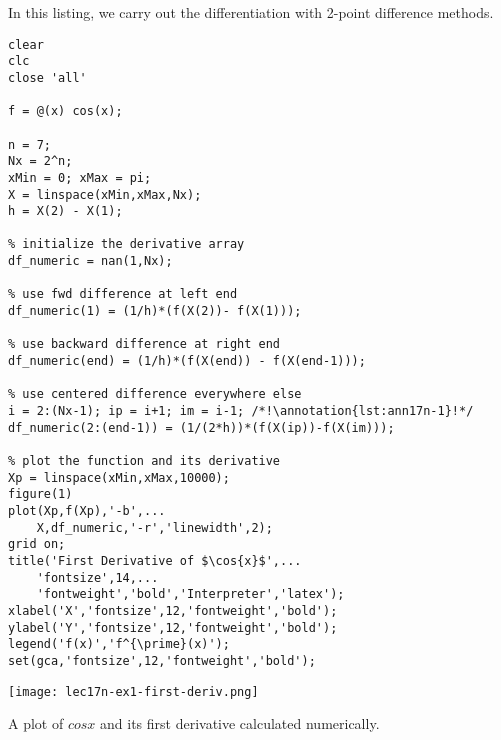 \noindent In this listing, we carry out the differentiation with 2-point difference methods. 
\begin{lstlisting}[style=myMatlab,name=lec17n-ex1]
clear
clc
close 'all'

f = @(x) cos(x);

n = 7;
Nx = 2^n;
xMin = 0; xMax = pi;
X = linspace(xMin,xMax,Nx);
h = X(2) - X(1);

% initialize the derivative array
df_numeric = nan(1,Nx); 

% use fwd difference at left end
df_numeric(1) = (1/h)*(f(X(2))- f(X(1)));

% use backward difference at right end
df_numeric(end) = (1/h)*(f(X(end)) - f(X(end-1)));

% use centered difference everywhere else
i = 2:(Nx-1); ip = i+1; im = i-1; /*!\annotation{lst:ann17n-1}!*/
df_numeric(2:(end-1)) = (1/(2*h))*(f(X(ip))-f(X(im)));

% plot the function and its derivative
Xp = linspace(xMin,xMax,10000);
figure(1)
plot(Xp,f(Xp),'-b',...
    X,df_numeric,'-r','linewidth',2);
grid on;
title('First Derivative of $\cos{x}$',...
    'fontsize',14,...
    'fontweight','bold','Interpreter','latex');
xlabel('X','fontsize',12,'fontweight','bold');
ylabel('Y','fontsize',12,'fontweight','bold');
legend('f(x)','f^{\prime}(x)');
set(gca,'fontsize',12,'fontweight','bold');
\end{lstlisting}
\begin{marginfigure}
\texttt{[image: lec17n-ex1-first-deriv.png]}
\caption{A plot of $cos{x}$ and its first derivative calculated numerically.}
\label{fig:lec17n-ex1-first-deriv}
\end{marginfigure}

